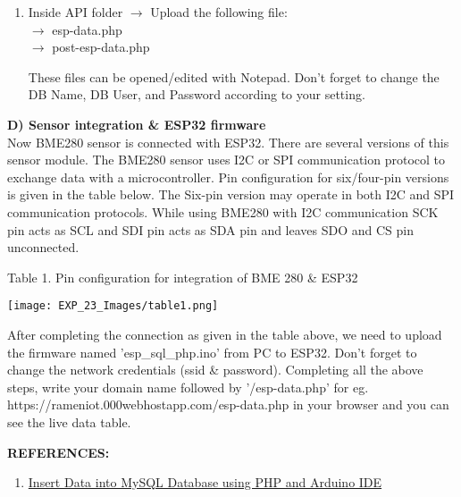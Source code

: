 \documentclass[12pt,a4paper]{article}
\begin{document}
\begin{justify}
\begin{enumerate}
\item Inside API folder $ \rightarrow $ Upload the following file:\\
$ \rightarrow $ esp-data.php\\
$ \rightarrow $ post-esp-data.php

These files can be opened/edited with Notepad. Don't forget to change the DB Name, DB User, and Password according to your setting.
\end{enumerate}

\noindent \textbf{D)	Sensor integration \& ESP32 firmware}\\[3pt]
Now BME280 sensor is connected with ESP32. There are several versions of this sensor module. The BME280 sensor uses I2C or SPI communication protocol to exchange data with a microcontroller. Pin configuration for six/four-pin versions is given in the table below. The Six-pin version may operate in both I2C and SPI communication protocols. While using BME280 with I2C communication SCK pin acts as SCL and SDI pin acts as SDA pin and leaves SDO and CS pin unconnected.

\vspace{8cm}

\begin{center} {Table 1. Pin configuration for integration of  BME 280 \& ESP32}\end{center}
\vspace{-8mm}
\begin{center} 
\texttt{[image: EXP\_23\_Images/table1.png]}
\end{center}
 \noindent After completing the connection as given in the table above, we need to upload the firmware named 'esp\_sql\_php.ino' from PC to ESP32. Don't forget to change the network credentials (ssid \& password). Completing all the above steps, write your domain name followed by '/esp-data.php' for eg. https://rameniot.000webhostapp.com/esp-data.php in your browser and you can see the live data table.

\vspace{10pt}
\noindent \textbf{\large REFERENCES:}
\vspace{-6mm}
\begin{enumerate}
\setlength\itemsep{-0.3em}
\item  \href {https://randomnerdtutorials.com/esp32-esp8266-mysql-database-php}{Insert Data into MySQL Database using PHP and Arduino IDE}

\end{enumerate}
\end{justify}
\end{document}
